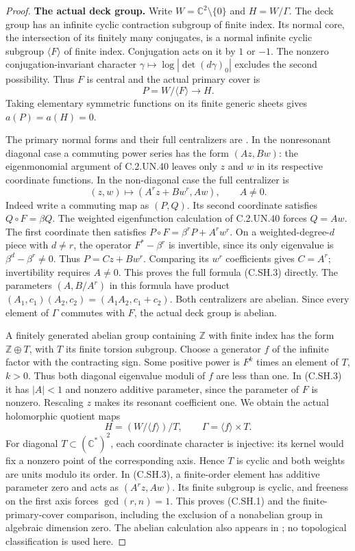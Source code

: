 \begin{proof}
\par\medskip\noindent\textbf{The actual deck group.}
Write $W=\mathbb C^2\setminus\{0\}$ and $H=W/\Gamma$.
The deck group has an infinite cyclic contraction subgroup of
finite index. Its normal core, the intersection of its finitely
many conjugates, is a normal infinite cyclic subgroup
$\langle F\rangle$ of finite index. Conjugation acts on it by
$1$ or $-1$. The nonzero conjugation-invariant character
$\gamma\mapsto\log|\det(d\gamma)_0|$ excludes the second
possibility. Thus $F$ is central and the actual primary cover is
\[
                 P=W/\langle F\rangle\longrightarrow H.
\tag{C.SH.2}
\]
Taking elementary symmetric functions on its finite generic
sheets gives $a(P)=a(H)=0$.

The primary normal forms and their full centralizers are
\cite[Theorem~2.1]{Khaled2024Hopf}. In the nonresonant diagonal
case a commuting power series has the form $(Az,Bw)$:
the eigenmonomial argument of C.2.UN.40 leaves only $z$ and
$w$ in its respective coordinate functions. In the
non-diagonal case the full centralizer is
\[
       (z,w)\longmapsto(A^r z+B w^r,Aw),\qquad A\ne0.
\tag{C.SH.3}
\]
Indeed write a commuting map as $(P,Q)$. Its second
coordinate satisfies $Q\circ F=\beta Q$. The weighted
eigenfunction calculation of C.2.UN.40 forces $Q=Aw$.
The first coordinate then satisfies
$P\circ F=\beta^rP+A^r w^r$. On a weighted-degree-$d$
piece with $d\ne r$, the operator $F^*-\beta^r$ is
invertible, since its only eigenvalue is
$\beta^d-\beta^r\ne0$. Thus $P=Cz+Bw^r$.
Comparing its $w^r$ coefficients gives $C=A^r$;
invertibility requires $A\ne0$. This proves the full
formula (C.SH.3) directly.
The parameters $(A,B/A^r)$ in this formula have product
$(A_1,c_1)(A_2,c_2)=(A_1A_2,c_1+c_2)$. Both centralizers
are abelian. Since every element of $\Gamma$ commutes
with $F$, the actual deck group is abelian.

A finitely generated abelian group containing $\mathbb Z$
with finite index has the form $\mathbb Z\oplus T$, with $T$
its finite torsion subgroup. Choose a generator $f$ of the
infinite factor with the contracting sign. Some positive power
is $F^k$ times an element of $T$, $k>0$. Thus both diagonal
eigenvalue moduli of $f$ are less than one. In (C.SH.3) it has
$|A|<1$ and nonzero additive parameter, since the parameter
of $F$ is nonzero. Rescaling $z$ makes its resonant coefficient
one. We obtain the actual holomorphic quotient maps
\[
       H=(W/\langle f\rangle)/T,\qquad
       \Gamma=\langle f\rangle\times T.
\tag{C.SH.4}
\]
For diagonal $T\subset(\mathbb C^*)^2$, each coordinate
character is injective: its kernel would fix a nonzero point
of the corresponding axis. Hence $T$ is cyclic and both
weights are units modulo its order. In (C.SH.3), a finite-order
element has additive parameter zero and acts as
$(A^r z,Aw)$. Its finite subgroup is cyclic, and freeness
on the first axis forces $\gcd(r,n)=1$. This proves (C.SH.1)
and the finite-primary-cover comparison, including the
exclusion of a nonabelian group in algebraic dimension zero.
The abelian calculation also appears in
\cite[\S3, pp.~230--232]{Kato1975Hopf}; no topological
classification is used here.


\end{proof}
